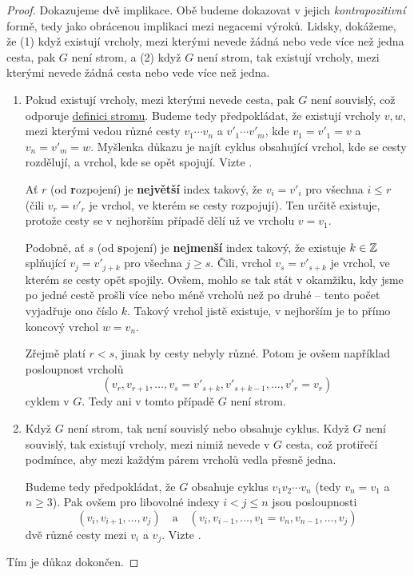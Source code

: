 \begin{proof}
	Dokazujeme dvě implikace. Obě budeme dokazovat v jejich \emph{kontrapozitivní}
	formě, tedy jako obrácenou implikaci mezi negacemi výroků. Lidsky, dokážeme, že
	(1) když existují vrcholy, mezi kterými nevede žádná nebo vede více než jedna
	cesta, pak $G$ není strom, a (2) když $G$ není strom, tak existují vrcholy,
	mezi kterými nevede žádná cesta nebo vede více než jedna.
	\begin{enumerate}
		\item Pokud existují vrcholy, mezi kterými nevede cesta, pak $G$ není
		      souvislý, což odporuje \hyperref[def:strom]{definici stromu}. Budeme tedy
		      předpokládat, že existují vrcholy $v,w$, mezi kterými vedou různé cesty $v_1
			      \cdots v_n$ a $v'_1 \cdots v'_m$, kde $v_1 = v'_1 = v$ a $v_n = v'_m = w$.
		      Myšlenka důkazu je najít cyklus obsahující vrchol, kde se cesty rozdělují, a
		      vrchol, kde se opět spojují. Vizte
		      .

		      Ať $r$ (od \textbf{r}ozpojení) je \textbf{největší} index takový, že $v_i =
			      v'_i$ pro všechna $i \leq r$ (čili $v_r = v'_r$ je vrchol, ve kterém se cesty
		      rozpojují). Ten určitě existuje, protože cesty se v nejhorším případě dělí už
		      ve vrcholu $v = v_1$.

		      Podobně, ať $s$ (od \textbf{s}pojení) je \textbf{nejmenší} index takový, že
		      existuje $k \in \mathbb{Z}$ splňující $v_j = v'_{j+k}$ pro všechna $j \geq s$. Čili,
		      vrchol $v_s = v'_{s+k}$ je vrchol, ve kterém se cesty opět spojily. Ovšem,
		      mohlo se tak stát v okamžiku, kdy jsme po jedné cestě prošli více nebo méně
		      vrcholů než po druhé -- tento počet vyjadřuje ono číslo $k$. Takový vrchol
		      jistě existuje, v nejhorším je to přímo koncový vrchol $w = v_n$.

		      Zřejmě platí $r < s$, jinak by cesty nebyly různé. Potom je ovšem například
		      posloupnost vrcholů
		      \[
			      (v_r,v_{r+1},\ldots,v_s = v'_{s+k},v'_{s+k-1},\ldots,v'_r = v_r)
		      \]
		      cyklem v $G$. Tedy ani v tomto případě $G$ není strom.
		\item Když $G$ není strom, tak není souvislý nebo obsahuje cyklus. Když $G$
		      není souvislý, tak existují vrcholy, mezi nimiž nevede v $G$ cesta, což
		      protiřečí podmínce, aby mezi každým párem vrcholů vedla přesně jedna.

		      Budeme tedy předpokládat, že $G$ obsahuje cyklus $v_1v_2 \cdots v_n$ (tedy
		      $v_n = v_1$ a $n \geq 3$). Pak ovšem pro libovolné indexy $i < j \leq n$ jsou
		      posloupnosti
		      \[
			      (v_i,v_{i+1},\ldots,v_j) \quad \text{a} \quad (v_i,v_{i-1},\ldots,v_1 =
			      v_n,v_{n-1},\ldots,v_j)
		      \]
		      dvě různé cesty mezi $v_i$ a $v_j$. Vizte
		      .
	\end{enumerate}
	Tím je důkaz dokončen.
\end{proof}

